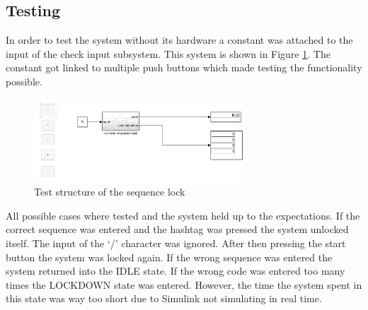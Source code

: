		\subsection{Testing}
		In order to test the system without its hardware a constant was attached to the input of the check input subsystem. This system is shown in Figure \ref{fig:test}. The constant got linked to multiple push buttons which made testing the functionality possible. 
			\begin{figure}[H]
					\centering
					\includegraphics[width=0.7\textwidth]{figures/testing_sim.png}
					\caption{Test structure of the sequence lock}
					\label{fig:test}
			\end{figure}
		All possible cases where tested and the system held up to the expectations. If the correct sequence was entered and the hashtag was pressed the system unlocked itself. The input of the ‘/’ character was ignored. After then pressing the start button the system was locked again. If the wrong sequence was entered the system returned into the IDLE state. If the wrong code was entered too many times the LOCKDOWN state was entered. However, the time the system spent in this state was way too short due to Simulink not simulating in real time.
		
